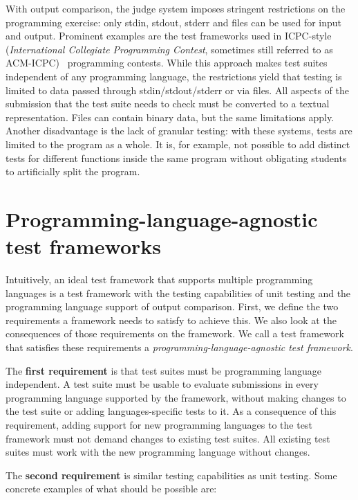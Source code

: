 \documentclass[../main]{subfiles}
\begin{document}
With output comparison, the judge system imposes stringent restrictions on the programming exercise: only stdin, stdout, stderr and files can be used for input and output.
Prominent examples are the test frameworks used in ICPC-style (\emph{International Collegiate Programming Contest}, sometimes still referred to as ACM-ICPC)~\autocite{ICPCFactSheet2020} programming contests.
While this approach makes test suites independent of any programming language, the restrictions yield that testing is limited to data passed through stdin/stdout/stderr or via files.
All aspects of the submission that the test suite needs to check must be converted to a textual representation.
Files can contain binary data, but the same limitations apply.
Another disadvantage is the lack of granular testing: with these systems, tests are limited to the program as a whole.
It is, for example, not possible to add distinct tests for different functions inside the same program without obligating students to artificially split the program.

\section{Programming-language-agnostic test frameworks}\label{sec:tested1-programming-language-agnostic-test-frameworks}

Intuitively, an ideal test framework that supports multiple programming languages is a test framework with the testing capabilities of unit testing and the programming language support of output comparison.
First, we define the two requirements a framework needs to satisfy to achieve this.
We also look at the consequences of those requirements on the framework.
We call a test framework that satisfies these requirements a \emph{programming-language-agnostic test framework}.

The \textbf{first requirement} is that test suites must be programming language independent.
A test suite must be usable to evaluate submissions in every programming language supported by the framework, without making changes to the test suite or adding languages-specific tests to it.
As a consequence of this requirement, adding support for new programming languages to the test framework must not demand changes to existing test suites.
All existing test suites must work with the new programming language without changes.

The \textbf{second requirement} is similar testing capabilities as unit testing.
Some concrete examples of what should be possible are:
\end{document}
